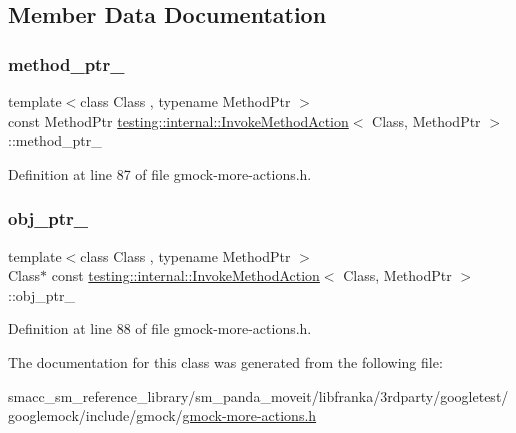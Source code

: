 \subsection{Member Data Documentation}
\mbox{\label{classtesting_1_1internal_1_1InvokeMethodAction_ad87861bde8960e57a429b3cf5ba70133}} 
\subsubsection{\texorpdfstring{method\+\_\+ptr\+\_\+}{method\_ptr\_}}
{\footnotesize\ttfamily template$<$class Class , typename Method\+Ptr $>$ \\
const Method\+Ptr \hyperlink{classtesting_1_1internal_1_1InvokeMethodAction}{testing\+::internal\+::\+Invoke\+Method\+Action}$<$ Class, Method\+Ptr $>$\+::method\+\_\+ptr\+\_\+\hspace{0.3cm}{\ttfamily [private]}}



Definition at line 87 of file gmock-\/more-\/actions.\+h.

\mbox{\label{classtesting_1_1internal_1_1InvokeMethodAction_ac857e8bad8f6417640145ab1f5740963}} 
\subsubsection{\texorpdfstring{obj\+\_\+ptr\+\_\+}{obj\_ptr\_}}
{\footnotesize\ttfamily template$<$class Class , typename Method\+Ptr $>$ \\
Class$\ast$ const \hyperlink{classtesting_1_1internal_1_1InvokeMethodAction}{testing\+::internal\+::\+Invoke\+Method\+Action}$<$ Class, Method\+Ptr $>$\+::obj\+\_\+ptr\+\_\+\hspace{0.3cm}{\ttfamily [private]}}



Definition at line 88 of file gmock-\/more-\/actions.\+h.



The documentation for this class was generated from the following file\+:\begin{DoxyCompactItemize}
\item 
smacc\+\_\+sm\+\_\+reference\+\_\+library/sm\+\_\+panda\+\_\+moveit/libfranka/3rdparty/googletest/googlemock/include/gmock/\hyperlink{gmock-more-actions_8h}{gmock-\/more-\/actions.\+h}\end{DoxyCompactItemize}
